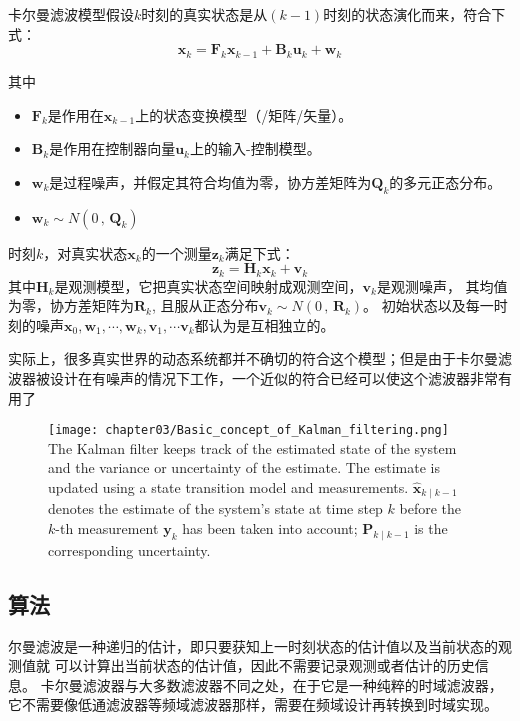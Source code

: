 卡尔曼滤波模型假设$k$时刻的真实状态是从$(k-1)$时刻的状态演化而来，符合下式：
\begin{equation}
  \bm{x}_k=\bm{F}_k \bm{x}_{k-1} + \bm{B}_k \bm{u}_{k} + \bm{w}_k
\end{equation}

其中
\begin{itemize}
  \item $\bm{F}_k$是作用在$\bm{x}_{k-1}$上的状态变换模型（/矩阵/矢量）。
  \item $\bm{B}_k$是作用在控制器向量$\bm{u}_k$上的输入-控制模型。
  \item $\bm{w}_k$是过程噪声，并假定其符合均值为零，协方差矩阵为$\bm{Q}_k$的多元正态分布。
  \item $\bm{w}_{k} \sim N(0 \, , \, \bm{Q}_k)$
\end{itemize}

时刻$k$，对真实状态$\bm{x}_k$的一个测量$\bm{z}_k$满足下式：
\begin{equation}
  \bm{z}_k=\bm{H}_k \bm{x}_k + \bm{v}_k
\end{equation}
其中$\bm{H}_k$是观测模型，它把真实状态空间映射成观测空间，$\bm{v}_k$是观测噪声，
其均值为零，协方差矩阵为$\bm{R}_k$,
且服从正态分布$\bm{v}_{k} \sim N(0 \, , \, \bm{R}_k)$。
初始状态以及每一时刻的噪声${\bm{x}_0, \bm{w}_1, \cdots ,
\bm{w}_k, \bm{v}_1, \cdots \bm{v}_k}$都认为是互相独立的。

实际上，很多真实世界的动态系统都并不确切的符合这个模型；但是由于卡尔曼滤波器被设计在有噪声的情况下工作，一个近似的符合已经可以使这个滤波器非常有用了
\begin{figure}[!htp]
  \centering
  \texttt{[image: chapter03/Basic\_concept\_of\_Kalman\_filtering.png]}
    {The Kalman filter keeps track of the estimated state of the system and the variance or uncertainty of the estimate. The estimate is updated using a state transition model and measurements. $\hat{\bm{x}}_{k \mid k-1}$ denotes the estimate of the system's state at time step $k$ before the $k$-th measurement $\bm{y}_k$ has been taken into account;
    $\bm{P}_{k\mid k-1}$ is the corresponding uncertainty.}
  \label{fig:Basic_concept_of_Kalman_filtering}
\end{figure}

\subsection{算法}
尔曼滤波是一种递归的估计，即只要获知上一时刻状态的估计值以及当前状态的观测值就
可以计算出当前状态的估计值，因此不需要记录观测或者估计的历史信息。
卡尔曼滤波器与大多数滤波器不同之处，在于它是一种纯粹的时域滤波器，
它不需要像低通滤波器等频域滤波器那样，需要在频域设计再转换到时域实现。

